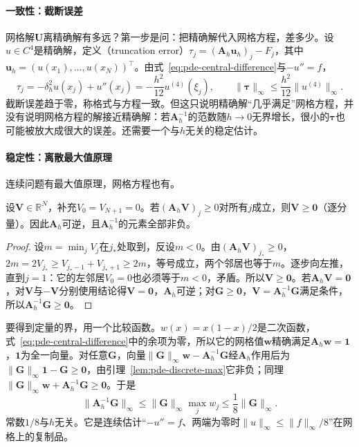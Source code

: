 \paragraph{一致性：截断误差}
网格解$\bm U$离精确解有多远？第一步是问：把精确解代入网格方程，差多少。设$u\in C^4$是精确解，定义（truncation error）$\tau_j=(\bm A_h\bm u_h)_j-F_j$，其中$\bm u_h=(u(x_1),\ldots,u(x_N))^{\top}$。由式~\eqref{eq:pde-central-difference}与$-u''=f$，
\[
  \tau_j=-\delta_h^2u(x_j)+u''(x_j)=-\frac{h^2}{12}u^{(4)}(\xi_j),\qquad\|\bm\tau\|_\infty\leq\frac{h^2}{12}\|u^{(4)}\|_\infty .
\]
截断误差趋于零，称格式与方程一致。但这只说明精确解“几乎满足”网格方程，并没有说明网格方程的解接近精确解：若$\bm A_h^{-1}$的范数随$h\to0$无界增长，很小的$\bm\tau$也可能被放大成很大的误差。还需要一个与$h$无关的稳定估计。

\paragraph{稳定性：离散最大值原理}
连续问题有最大值原理，网格方程也有。

\begin{lemma}[离散最大值原理]
\label{lem:pde-discrete-max}
设$\bm V\in\mathbb R^N$，补充$V_0=V_{N+1}=0$。若$(\bm A_h\bm V)_j\geq0$对所有$j$成立，则$\bm V\geq\bm 0$（逐分量）。因此$\bm A_h$可逆，且$\bm A_h^{-1}$的元素全部非负。
\end{lemma}

\begin{proof}
设$m=\min_jV_j$在$j_*$处取到，反设$m<0$。由$(\bm A_h\bm V)_{j_*}\geq0$，$2m=2V_{j_*}\geq V_{j_*-1}+V_{j_*+1}\geq2m$，等号成立，两个邻居也等于$m$。逐步向左推，直到$j=1$：它的左邻居$V_0=0$也必须等于$m<0$，矛盾。所以$\bm V\geq\bm 0$。若$\bm A_h\bm V=\bm 0$，对$\bm V$与$-\bm V$分别使用结论得$\bm V=\bm 0$，$\bm A_h$可逆；对$\bm G\geq\bm 0$，$\bm V=\bm A_h^{-1}\bm G$满足条件，所以$\bm A_h^{-1}\bm G\geq\bm 0$。
\end{proof}

要得到定量的界，用一个比较函数。$w(x)=x(1-x)/2$是二次函数，式~\eqref{eq:pde-central-difference}中的余项为零，所以它的网格值$\bm w$精确满足$\bm A_h\bm w=\bm 1$，$\bm 1$为全一向量。对任意$\bm G$，向量$\|\bm G\|_\infty\bm w-\bm A_h^{-1}\bm G$经$\bm A_h$作用后为$\|\bm G\|_\infty\bm 1-\bm G\geq\bm 0$，由引理~\ref{lem:pde-discrete-max}它非负；同理$\|\bm G\|_\infty\bm w+\bm A_h^{-1}\bm G\geq\bm 0$。于是
\begin{equation}
  \|\bm A_h^{-1}\bm G\|_\infty\leq\|\bm G\|_\infty\max_jw_j\leq\frac18\|\bm G\|_\infty .
  \label{eq:pde-fd-stability}
\end{equation}
常数$1/8$与$h$无关。它是连续估计“$-u''=f$、两端为零时$\|u\|_\infty\leq\|f\|_\infty/8$”在网格上的复制品。

